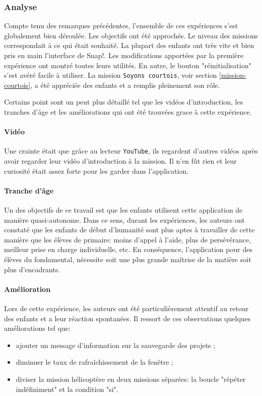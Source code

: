 \subsubsection{Analyse}
\label{analyse-scienceinfuse}
Compte tenu des remarques précédentes, l'ensemble de ces expériences s'est globalement bien déroulée. Les objectifs ont été approchés. Le niveau des missions correspondait à ce qui était souhaité. La plupart des enfants ont très vite et bien pris en main l'interface de Snap!. Les modifications apportées par la première expérience ont montré toutes leurs utilités. En autre, le bouton "réinitialisation" s'est avéré facile à utiliser. La mission \texttt{Soyons courtois}, voir section \ref{mission-courtois}, a été appréciée des enfants et a remplis pleinement son rôle.

Certains point sont un peut plus détaillé tel que les vidéos d'introduction, les tranches d'âge et les améliorations qui ont été trouvées grace à cette expérience.

\paragraph{Vidéo}
Une crainte était que grâce au lecteur \texttt{YouTube}, ils regardent d'autres vidéos après avoir regarder leur vidéo d'introduction à la mission. Il n'en fût rien et leur curiosité était assez forte pour les garder dans l'application.

\paragraph{Tranche d'âge}
\label{trancheage}
Un des objectifs de ce travail est que les enfants utilisent cette application de manière quasi-autonome. Dans ce sens, durant les expériences, les auteurs ont constaté que les enfants de début d'humanité sont plus aptes à travailler de cette manière que les élèves de primaire: moins d'appel à l'aide, plus de persévérance, meilleur prise en charge individuelle, etc.
En conséquence, l'application pour des élèves du fondamental, nécessite soit une plus grande maîtrise de la matière soit plus d'encadrants.

\paragraph{Amélioration}
Lors de cette expérience, les auteurs ont été particulièrement attentif au retour des enfants et a leur réaction spontanées. Il ressort de ces observations quelques améliorations tel que:
\begin{itemize}
  \item ajouter un message d'information sur la sauvegarde des projets ;
  \item diminuer le taux de rafraîchissement de la fenêtre ;
  \item diviser la mission hélicoptère en deux missions séparées: la boucle "répéter indéfiniment" et la condition "si".
\end{itemize}

